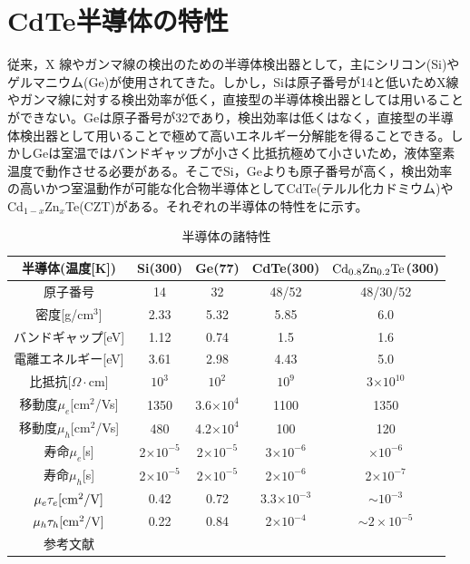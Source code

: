 \section{CdTe半導体の特性}
従来，X 線やガンマ線の検出のための半導体検出器として，主にシリコン(Si)やゲルマニウム(Ge)が使用されてきた。しかし，Siは原子番号が14と低いためX線やガンマ線に対する検出効率が低く，直接型の半導体検出器としては用いることができない。Geは原子番号が32であり，検出効率は低くはなく，直接型の半導体検出器として用いることで極めて高いエネルギー分解能を得ることできる。しかしGeは室温ではバンドギャップが小さく比抵抗極めて小さいため，液体窒素温度で動作させる必要がある。そこでSi，Geよりも原子番号が高く，検出効率の高いかつ室温動作が可能な化合物半導体としてCdTe(テルル化カドミウム)やCd$_{1-x}$Zn$_x$Te(CZT)がある。それぞれの半導体の特性をに示す。
\begin{table}[H]
\begin{center}
\begin{tabular}{ccccc} \hline
半導体(温度[K]) & Si(300) & Ge(77) & CdTe(300) & $\rm Cd_{0.8}Zn_{0.2}Te$(300) \\\hline
原子番号 & 14 & 32 & 48/52 & 48/30/52 \\
密度[g/cm$^3$] & 2.33 & 5.32 & 5.85 & 6.0 \\
バンドギャップ[eV] & 1.12 & 0.74 & 1.5 & 1.6 \\
電離エネルギー[eV] & 3.61 & 2.98 & 4.43 & 5.0 \\
比抵抗[$\Omega\cdot$cm] & $10^3$ & $10^2$ & $10^9$ & 3$\times10^{10}$\cite{takahashi} \\
移動度$\mu_e$[cm$^2$/Vs] & 1350 & 3.6$\times10^4$ & 1100 & 1350 \\
移動度$\mu_h$[cm$^2$/Vs] & 480 & 4.2$\times10^4$ & 100 & 120 \\
寿命$\mu_e$[s] & 2$\times10^{-5}$ & 2$\times10^{-5}$ & 3$\times10^{-6}$ & $\times10^{-6}$ \\
寿命$\mu_h$[s] & 2$\times10^{-5}$ & 2$\times10^{-5}$ & 2$\times10^{-6}$ & 2$\times10^{-7}$ \\
$\mu_e\tau_e\rm[cm^2/V]$ & 0.42 & 0.72 & 3.3$\times10^{-3}$ & $\sim10^{-3}$ \\
$\mu_h\tau_h\rm[cm^2/V]$ & 0.22 & 0.84 & 2$\times10^{-4}$ & $\sim2\times10^{-5}$ \\
参考文献 & \cite{sakai} & \cite{sakai} & \cite{Bellazzini} & \cite{McGregor} \\\hline
\end{tabular}
\end{center}
\caption{半導体の諸特性}
\label{semi_chara}
\end{table}

